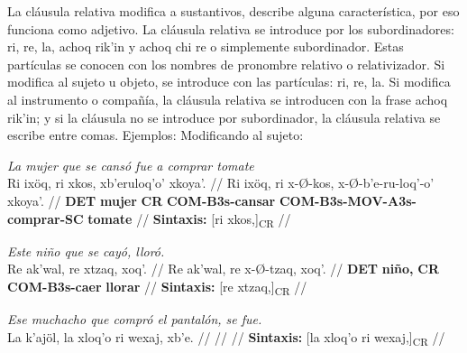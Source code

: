 \documentclass{article}%
\begin{document}
%
La cláusula relativa modifica a sustantivos, describe alguna característica, por eso %
funciona como adjetivo. La cláusula relativa se introduce por los subordinadores: ri, %
re, la, achoq rik'in y achoq chi re o simplemente subordinador. Estas partículas se %
conocen con los nombres de pronombre relativo o relativizador. Si modifica al sujeto u %
objeto, se introduce con las partículas: ri, re, la. Si modifica al instrumento o compañía, %
la cláusula relativa se introducen con la frase achoq rik'in; y si la cláusula no se %
introduce por subordinador, la cláusula relativa se escribe entre comas. Ejemplos: %
Modificando al sujeto: %
\par\medskip%
\ex
\textit{La mujer que se cansó fue a comprar tomate} \\
\begingl
\gla Ri ixöq, ri xkos, xb'eruloq'o' xkoya'. //
\glb Ri ixöq, ri x-Ø-kos, x-Ø-b'e-ru-loq'-o' xkoya'. //
\glc \textbf{DET} \textbf{mujer} \textbf{CR} \textbf{COM-}\textbf{B3s-}\textbf{cansar} \textbf{COM-}\textbf{B3s-}\textbf{MOV-}\textbf{A3s-}\textbf{comprar-}\textbf{SC} \textbf{tomate} //
\glft \textbf{Sintaxis:} [ri xkos,]\textsubscript{CR} //
\endgl
\xe
%
\medskip%
\par\medskip%
\ex
\textit{Este niño que se cayó, lloró.} \\
\begingl
\gla Re ak'wal, re xtzaq, xoq'. //
\glb Re ak'wal, re x-Ø-tzaq, xoq'. //
\glc \textbf{DET} \textbf{niño,} \textbf{CR} \textbf{COM-}\textbf{B3s-}\textbf{caer} \textbf{llorar} //
\glft \textbf{Sintaxis:} [re xtzaq,]\textsubscript{CR} //
\endgl
\xe
%
\medskip%
\par\medskip%
\ex
\textit{Ese muchacho que compró el pantalón, se fue.} \\
\begingl
\gla La k'ajöl, la xloq'o ri wexaj, xb'e. //
\glb  //
\glc  //
\glft \textbf{Sintaxis:} [la xloq'o ri wexaj,]\textsubscript{CR} //
\endgl
\xe
%
\medskip

%
\end{document}
